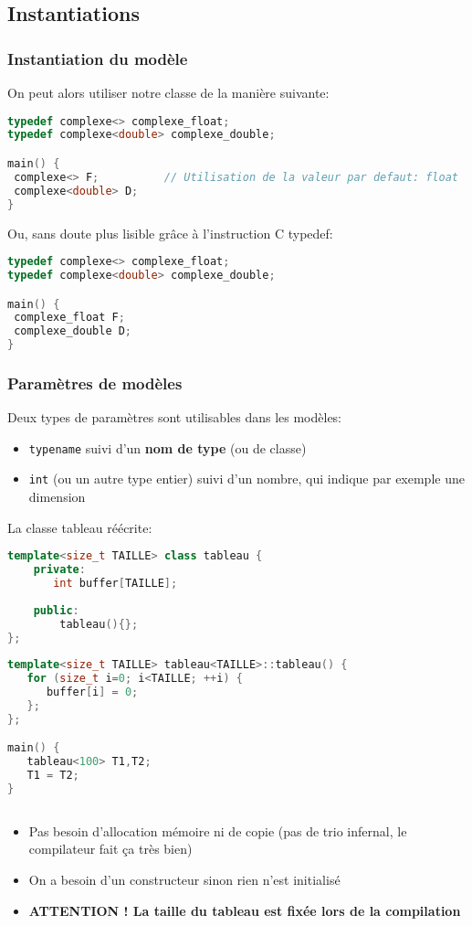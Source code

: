 \documentclass{beamer}
\begin{document}
\subsection{Instantiations}

\begin{frame}[fragile=singleslide,shrink=20]
\frametitle {Instantiation du modèle}

On peut alors utiliser notre classe de la manière suivante:
\begin{lstlisting}[language=c++]
typedef complexe<> complexe_float;
typedef complexe<double> complexe_double;

main() {
 complexe<> F;          // Utilisation de la valeur par defaut: float
 complexe<double> D;
}
\end{lstlisting}

Ou, sans doute plus lisible grâce à l'instruction C typedef:
\begin{lstlisting}[language=c++]
typedef complexe<> complexe_float;
typedef complexe<double> complexe_double;

main() {
 complexe_float F;
 complexe_double D;
}
\end{lstlisting}
\end{frame}

\begin{frame}[fragile=singleslide,shrink=20]
\frametitle {Paramètres de modèles}

Deux types de paramètres sont utilisables dans les modèles:

\begin{itemize}
\item{\texttt{typename} suivi d'un \textbf{nom de type} (ou de classe) }
\item{\texttt{int} (ou un autre type entier) suivi d'un nombre, qui indique par exemple une dimension}
\end{itemize}

La classe tableau réécrite:
\begin{lstlisting}[language=c++]
template<size_t TAILLE> class tableau {
    private:
       int buffer[TAILLE];
    
    public:
        tableau(){};
};
    
template<size_t TAILLE> tableau<TAILLE>::tableau() {
   for (size_t i=0; i<TAILLE; ++i) { 
      buffer[i] = 0; 
   };
};

main() {
   tableau<100> T1,T2;
   T1 = T2;
}
   
\end{lstlisting}

\begin{itemize}
\item{Pas besoin d'allocation mémoire ni de copie (pas de trio infernal, le compilateur fait ça très bien)}
\item{On a besoin d'un constructeur sinon rien n'est initialisé}
\item{\textbf{ATTENTION ! La taille du tableau est fixée lors de la compilation}}
\end{itemize}
\end{frame}
\end{document}
